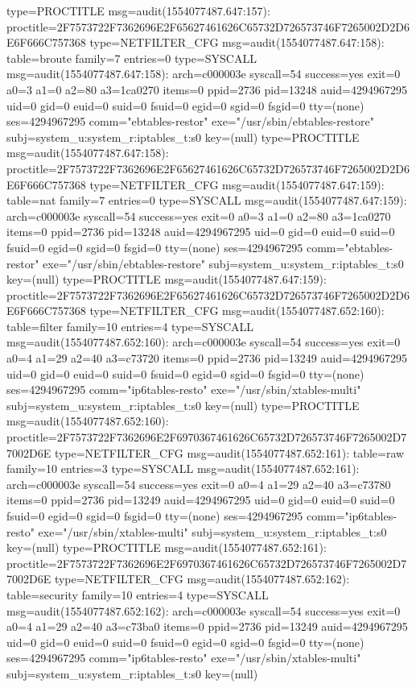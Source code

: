 \documentclass[]{report}
\newenvironment{Shaded}{}{}
\newcommand{\NormalTok}[1]{#1}
\begin{document}
\begin{Shaded}
\begin{Highlighting}[]
\NormalTok{type=PROCTITLE msg=audit(1554077487.647:157): proctitle=2F7573722F7362696E2F65627461626C65732D726573746F7265002D2D6E6F666C757368}
\NormalTok{type=NETFILTER_CFG msg=audit(1554077487.647:158): table=broute family=7 entries=0}
\NormalTok{type=SYSCALL msg=audit(1554077487.647:158): arch=c000003e syscall=54 success=yes exit=0 a0=3 a1=0 a2=80 a3=1ca0270 items=0 ppid=2736 pid=13248 auid=4294967295 uid=0 gid=0 euid=0 suid=0 fsuid=0 egid=0 sgid=0 fsgid=0 tty=(none) ses=4294967295 comm="ebtables-restor" exe="/usr/sbin/ebtables-restore" subj=system_u:system_r:iptables_t:s0 key=(null)}
\NormalTok{type=PROCTITLE msg=audit(1554077487.647:158): proctitle=2F7573722F7362696E2F65627461626C65732D726573746F7265002D2D6E6F666C757368}
\NormalTok{type=NETFILTER_CFG msg=audit(1554077487.647:159): table=nat family=7 entries=0}
\NormalTok{type=SYSCALL msg=audit(1554077487.647:159): arch=c000003e syscall=54 success=yes exit=0 a0=3 a1=0 a2=80 a3=1ca0270 items=0 ppid=2736 pid=13248 auid=4294967295 uid=0 gid=0 euid=0 suid=0 fsuid=0 egid=0 sgid=0 fsgid=0 tty=(none) ses=4294967295 comm="ebtables-restor" exe="/usr/sbin/ebtables-restore" subj=system_u:system_r:iptables_t:s0 key=(null)}
\NormalTok{type=PROCTITLE msg=audit(1554077487.647:159): proctitle=2F7573722F7362696E2F65627461626C65732D726573746F7265002D2D6E6F666C757368}
\NormalTok{type=NETFILTER_CFG msg=audit(1554077487.652:160): table=filter family=10 entries=4}
\NormalTok{type=SYSCALL msg=audit(1554077487.652:160): arch=c000003e syscall=54 success=yes exit=0 a0=4 a1=29 a2=40 a3=c73720 items=0 ppid=2736 pid=13249 auid=4294967295 uid=0 gid=0 euid=0 suid=0 fsuid=0 egid=0 sgid=0 fsgid=0 tty=(none) ses=4294967295 comm="ip6tables-resto" exe="/usr/sbin/xtables-multi" subj=system_u:system_r:iptables_t:s0 key=(null)}
\NormalTok{type=PROCTITLE msg=audit(1554077487.652:160): proctitle=2F7573722F7362696E2F6970367461626C65732D726573746F7265002D77002D6E}
\NormalTok{type=NETFILTER_CFG msg=audit(1554077487.652:161): table=raw family=10 entries=3}
\NormalTok{type=SYSCALL msg=audit(1554077487.652:161): arch=c000003e syscall=54 success=yes exit=0 a0=4 a1=29 a2=40 a3=c73780 items=0 ppid=2736 pid=13249 auid=4294967295 uid=0 gid=0 euid=0 suid=0 fsuid=0 egid=0 sgid=0 fsgid=0 tty=(none) ses=4294967295 comm="ip6tables-resto" exe="/usr/sbin/xtables-multi" subj=system_u:system_r:iptables_t:s0 key=(null)}
\NormalTok{type=PROCTITLE msg=audit(1554077487.652:161): proctitle=2F7573722F7362696E2F6970367461626C65732D726573746F7265002D77002D6E}
\NormalTok{type=NETFILTER_CFG msg=audit(1554077487.652:162): table=security family=10 entries=4}
\NormalTok{type=SYSCALL msg=audit(1554077487.652:162): arch=c000003e syscall=54 success=yes exit=0 a0=4 a1=29 a2=40 a3=c73ba0 items=0 ppid=2736 pid=13249 auid=4294967295 uid=0 gid=0 euid=0 suid=0 fsuid=0 egid=0 sgid=0 fsgid=0 tty=(none) ses=4294967295 comm="ip6tables-resto" exe="/usr/sbin/xtables-multi" subj=system_u:system_r:iptables_t:s0 key=(null)}

\end{Highlighting}
\end{Shaded}
\end{document}
